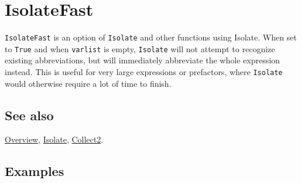 \documentclass[../FeynCalcManual.tex]{subfiles}
\begin{document}
\hypertarget{isolatefast}{
\section{IsolateFast}\label{isolatefast}}

\texttt{IsolateFast} is an option of \texttt{Isolate} and other
functions using Isolate. When set to \texttt{True} and when
\texttt{varlist} is empty, \texttt{Isolate} will not attempt to
recognize existing abbreviations, but will immediately abbreviate the
whole expression instead. This is useful for very large expressions or
prefactors, where \texttt{Isolate} would otherwise require a lot of time
to finish.

\subsection{See also}

\hyperlink{toc}{Overview}, \hyperlink{isolate}{Isolate},
\hyperlink{collect2}{Collect2}.

\subsection{Examples}
\end{document}
